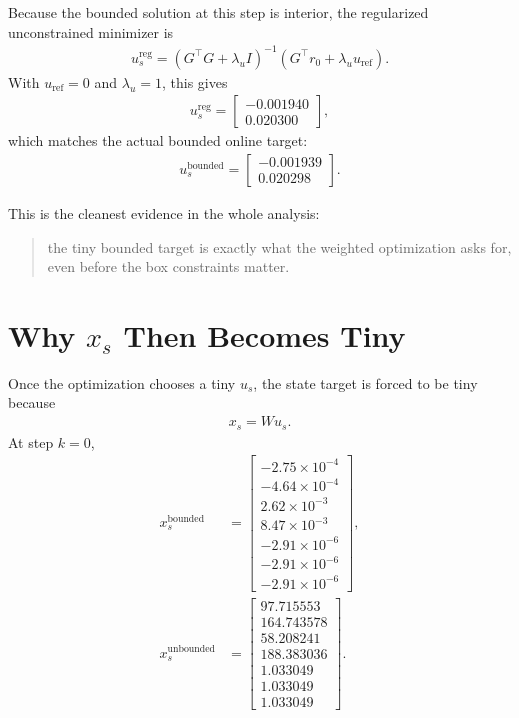 \documentclass[11pt]{article}
\begin{document}
Because the bounded solution at this step is interior, the regularized unconstrained minimizer is
\begin{align}
u_s^{\mathrm{reg}}
=
(G^\top G + \lambda_u I)^{-1}(G^\top r_0 + \lambda_u u_{\mathrm{ref}}).
\end{align}
With \(u_{\mathrm{ref}} = 0\) and \(\lambda_u = 1\), this gives
\begin{align}
u_s^{\mathrm{reg}}
=
\begin{bmatrix}
-0.001940 \\
0.020300
\end{bmatrix},
\end{align}
which matches the actual bounded online target:
\begin{align}
u_s^{\mathrm{bounded}}
=
\begin{bmatrix}
-0.001939 \\
0.020298
\end{bmatrix}.
\end{align}

This is the cleanest evidence in the whole analysis:
\begin{quote}
the tiny bounded target is exactly what the weighted optimization asks for, even before the box constraints matter.
\end{quote}

\section{Why \texorpdfstring{$x_s$}{x\_s} Then Becomes Tiny}

Once the optimization chooses a tiny \(u_s\), the state target is forced to be tiny because
\begin{align}
x_s = Wu_s.
\end{align}
At step \(k=0\),
\begin{align}
x_s^{\mathrm{bounded}}
&=
\begin{bmatrix}
-2.75\times 10^{-4} \\
-4.64\times 10^{-4} \\
2.62\times 10^{-3} \\
8.47\times 10^{-3} \\
-2.91\times 10^{-6} \\
-2.91\times 10^{-6} \\
-2.91\times 10^{-6}
\end{bmatrix}, \\
x_s^{\mathrm{unbounded}}
&=
\begin{bmatrix}
97.715553 \\
164.743578 \\
58.208241 \\
188.383036 \\
1.033049 \\
1.033049 \\
1.033049
\end{bmatrix}.
\end{align}
\end{document}
